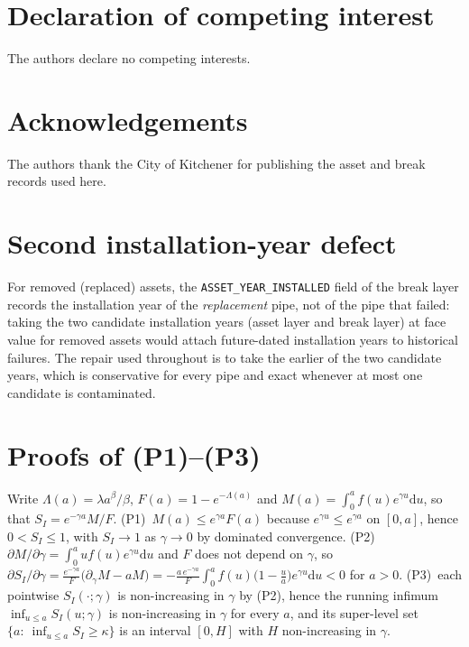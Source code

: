 \documentclass[review,12pt,authoryear]{elsarticle}
\begin{document}
\section*{Declaration of competing interest}
The authors declare no competing interests.

\section*{Acknowledgements}
The authors thank the City of Kitchener for publishing the asset and break
records used here.



\appendix

\section{Second installation-year defect}
\label{app:defect2}
For removed (replaced) assets, the \texttt{ASSET\_YEAR\_INSTALLED} field of
the break layer records the installation year of the \emph{replacement}
pipe, not of the pipe that failed: taking the two candidate installation
years (asset layer and break layer) at face value for removed assets would
attach future-dated installation years to historical failures. The repair
used throughout is to take the earlier of the two candidate years, which is
conservative for every pipe and exact whenever at most one candidate is
contaminated.

\section{Proofs of (P1)--(P3)}
\label{app:proofs}
Write $\Lambda(a)=\lambda a^\beta/\beta$, $F(a)=1-e^{-\Lambda(a)}$ and
$M(a)=\int_0^a f(u)e^{\gamma u}\mathrm{d}u$, so that
$S_I=e^{-\gamma a}M/F$. (P1)~$M(a)\le e^{\gamma a}F(a)$ because
$e^{\gamma u}\le e^{\gamma a}$ on $[0,a]$, hence $0<S_I\le1$, with
$S_I\to1$ as $\gamma\to0$ by dominated convergence.
(P2)~$\partial M/\partial\gamma=\int_0^a u f(u)e^{\gamma u}\mathrm{d}u$
and $F$ does not depend on $\gamma$, so
$\partial S_I/\partial\gamma =
\frac{e^{-\gamma a}}{F}\big(\partial_\gamma M - aM\big)
= -\frac{a\,e^{-\gamma a}}{F}\int_0^a f(u)\big(1-\tfrac{u}{a}\big)
e^{\gamma u}\mathrm{d}u <0$ for $a>0$.
(P3)~each pointwise $S_I(\cdot;\gamma)$ is non-increasing in $\gamma$ by
(P2), hence the running infimum $\inf_{u\le a}S_I(u;\gamma)$ is
non-increasing in $\gamma$ for every $a$, and its super-level set
$\{a:\ \inf_{u\le a}S_I\ge\kappa\}$ is an interval $[0,H]$ with $H$
non-increasing in $\gamma$.
\end{document}
